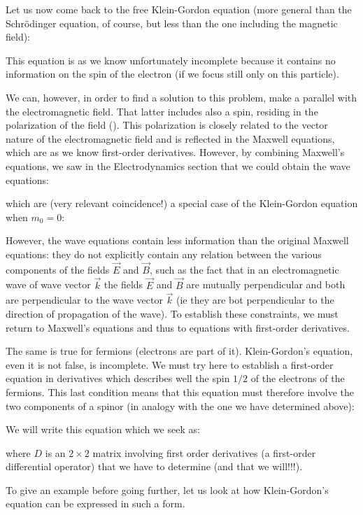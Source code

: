 	Let us now come back to the free Klein-Gordon equation (more general than the Schrödinger equation, of course, but less than the one including the magnetic field):
	
	This equation is as we know unfortunately incomplete because it contains no information on the spin of the electron (if we focus still only on this particle).

	We can, however, in order to find a solution to this problem, make a parallel with the electromagnetic field. That latter includes also a spin, residing in the polarization of the field (). This polarization is closely related to the vector nature of the electromagnetic field and is reflected in the Maxwell equations, which are as we know first-order derivatives. However, by combining Maxwell's equations, we saw in the Electrodynamics section that we could obtain the wave equations:
	
	which are (very relevant coincidence!) a special case of the Klein-Gordon equation when $m_0=0$:
	
	However, the wave equations contain less information than the original Maxwell equations: they do not explicitly contain any relation between the various components of the fields $\vec{E}$ and $\vec{B}$, such as the fact that in an electromagnetic wave of wave vector $\vec{k}$ the fields $\vec{E}$ and $\vec{B}$ are mutually perpendicular and both are perpendicular to the wave vector $\vec{k}$ (ie they are bot perpendicular to the direction of propagation of the wave). To establish these constraints, we must return to Maxwell's equations and thus to equations with first-order derivatives.

	The same is true for fermions (electrons are part of it). Klein-Gordon's equation, even it is not false, is incomplete. We must try here to establish a first-order equation in derivatives which describes well the spin $1/2$ of the electrons of the fermions. This last condition means that this equation must therefore involve the two components of a spinor (in analogy with the one we have determined above):
	
	We will write this equation which we seek as:
	
	where $D$ is an $2\times 2$ matrix involving first order derivatives (a first-order differential operator) that we have to determine (and that we will!!!).

	To give an example before going further, let us look at how Klein-Gordon's equation can be expressed in such a form.

